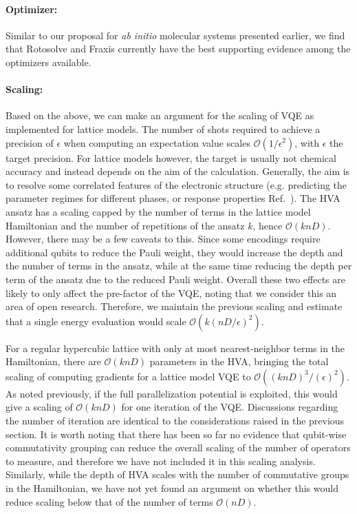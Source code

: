 \paragraph{Optimizer: } Similar to our proposal for \textit{ab initio} molecular systems presented earlier, we find that Rotosolve \cite{Vidal2018, nakanishi_sequential_2020,ostaszewskiStructureOptimizationParameterized2021} and Fraxis \cite{Watanabe2021WatanabeOptimizingSelection, Wada2021SimulatingCircuits} currently have the best supporting evidence among the optimizers available.

\paragraph{Scaling:} Based on the above, we can make an argument for the scaling of VQE as implemented for lattice models. The number of shots required to achieve a precision of $\epsilon$ when computing an expectation value scales $\mathcal{O}(1/\epsilon^2)$, with $\epsilon$ the target precision. For lattice models however, the target is usually not chemical accuracy and instead depends on the aim of the calculation. Generally, the aim is to resolve some correlated features of the electronic structure (e.g. predicting the parameter regimes for different phases, or response properties Ref.~\cite{Fan1970, Marro1999, Stanislavchuk2015, Choi2019}). The HVA ansatz has a scaling capped by the number of terms in the lattice model Hamiltonian and the number of repetitions of the ansatz $k$, hence $\mathcal{O}(knD)$. However, there may be a few caveats to this. Since some encodings require additional qubits to reduce the Pauli weight, they would increase the depth and the number of terms in the ansatz, while at the same time reducing the depth per term of the ansatz due to the reduced Pauli weight. Overall these two effects are likely to only affect the pre-factor of the VQE, noting that we consider this an area of open research. Therefore, we maintain the previous scaling and estimate that a single energy evaluation would scale $\mathcal{O}(k(nD/\epsilon)^2)$. 

For a regular hypercubic lattice with only at most nearest-neighbor terms in the Hamiltonian, there are $\mathcal{O}(knD)$ parameters in the HVA, bringing the total scaling of computing gradients for a lattice model VQE to $\mathcal{O}((knD)^3/(\epsilon)^2)$. As noted previously, if the full parallelization potential is exploited, this would give a scaling of $\mathcal{O}(knD)$ for one iteration of the VQE. Discussions regarding the number of iteration are identical to the considerations raised in the previous section. It is worth noting that there has been so far no evidence that qubit-wise commutativity grouping can reduce the overall scaling of the number of operators to measure, and therefore we have not included it in this scaling analysis. Similarly, while the depth of HVA scales with the number of commutative groups in the Hamiltonian, we have not yet found an argument on whether this would reduce scaling below that of the number of terms $\mathcal{O}(nD)$.

